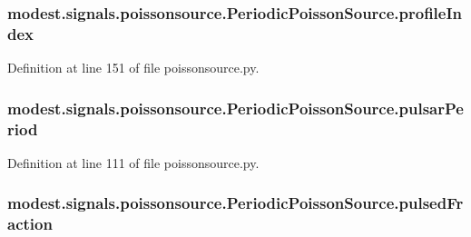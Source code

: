 \subsubsection[{\texorpdfstring{profile\+Index}{profileIndex}}]{\setlength{\rightskip}{0pt plus 5cm}modest.\+signals.\+poissonsource.\+Periodic\+Poisson\+Source.\+profile\+Index}\hypertarget{classmodest_1_1signals_1_1poissonsource_1_1PeriodicPoissonSource_a61c32fbdb323e66149905e46b70a0e4c}{}\label{classmodest_1_1signals_1_1poissonsource_1_1PeriodicPoissonSource_a61c32fbdb323e66149905e46b70a0e4c}


Definition at line 151 of file poissonsource.\+py.

\subsubsection[{\texorpdfstring{pulsar\+Period}{pulsarPeriod}}]{\setlength{\rightskip}{0pt plus 5cm}modest.\+signals.\+poissonsource.\+Periodic\+Poisson\+Source.\+pulsar\+Period}\hypertarget{classmodest_1_1signals_1_1poissonsource_1_1PeriodicPoissonSource_a602c543f1a87a280ea021748fb2d8b84}{}\label{classmodest_1_1signals_1_1poissonsource_1_1PeriodicPoissonSource_a602c543f1a87a280ea021748fb2d8b84}


Definition at line 111 of file poissonsource.\+py.

\subsubsection[{\texorpdfstring{pulsed\+Fraction}{pulsedFraction}}]{\setlength{\rightskip}{0pt plus 5cm}modest.\+signals.\+poissonsource.\+Periodic\+Poisson\+Source.\+pulsed\+Fraction}\hypertarget{classmodest_1_1signals_1_1poissonsource_1_1PeriodicPoissonSource_adf39e84e02a1f4c98f4850853bca4d87}{}\label{classmodest_1_1signals_1_1poissonsource_1_1PeriodicPoissonSource_adf39e84e02a1f4c98f4850853bca4d87}


